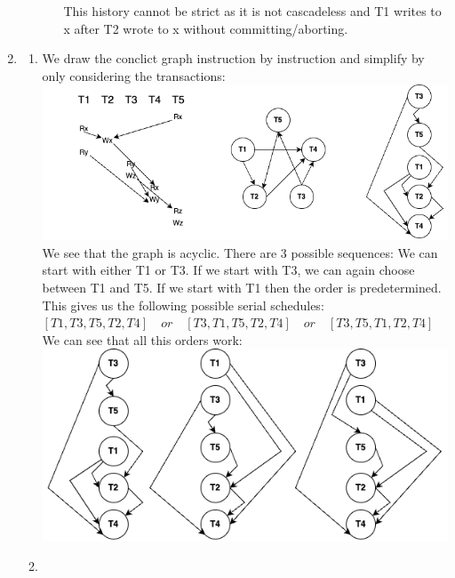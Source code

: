 \documentclass[12pt]{extarticle}
\begin{document}
\begin{flushleft}
\begin{enumerate}[label=\textbf{\Alph*.}]
\begin{enumerate}[label=\arabic*.]
\begin{enumerate}[label=(\alph*)]
This history cannot be strict as it is not cascadeless and T1 writes to x after T2 wrote to x without committing/aborting.
\end{enumerate}
\end{enumerate}
\item \begin{enumerate}[label=(\alph*)]
\item We draw the conclict graph instruction by instruction and simplify by only considering the transactions: \includegraphics[width=\linewidth]{graph_a}
We see that the graph is acyclic. There are 3 possible sequences: We can start with either T1 or T3. If we start with T3, we can again choose between T1 and T5. If we start with T1 then the order is predetermined. This gives us the following possible serial schedules: $[T1, T3, T5, T2, T4 ] \quad or\quad [T3, T1, T5, T2, T4 ] \quad or \quad  [T3,  T5, T1,T2, T4 ] $
We can see that all this orders work:
 \includegraphics[width=\linewidth]{serial_example_a}
\item
\end{enumerate}

\end{enumerate}
\end{flushleft}
\end{document}
